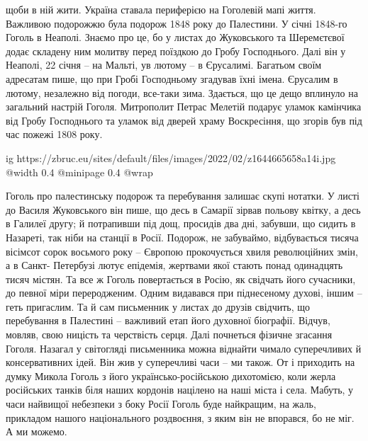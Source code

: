 щоби в ній жити. Україна ставала периферією на Гоголевій мапі життя. Важливою
подорожжю була подорож 1848 року до Палестини. У січні 1848-го Гоголь в
Неаполі. Знаємо про це, бо у листах до Жуковського та Шеремєтєвої додає
складену ним молитву перед поїздкою до Гробу Господнього. Далі він у Неаполі,
22 січня – на Мальті, ув лютому – в Єрусалимі. Багатьом своїм адресатам пише,
що при Гробі Господньому згадував їхні імена. Єрусалим в лютому, незалежно від
погоди, все-таки зима. Здається, що це дещо вплинуло на загальний настрій
Гоголя. Митрополит Петрас Мелетій подарує уламок камінчика від Гробу
Господнього та уламок від дверей храму Воскресіння, що згорів був під час
пожежі 1808 року. 

\ifcmt
  ig https://zbruc.eu/sites/default/files/images/2022/02/z1644665658a14i.jpg
  @width 0.4
  @minipage 0.4
  @wrap \parpic[r]
\fi


Гоголь про палестинську подорож та перебування залишає скупі
нотатки. У листі до Василя Жуковського він пише, що десь в Самарії зірвав
польову квітку, а десь в Галилеї другу; й потрапивши під дощ, просидів два дні,
забувши, що сидить в Назареті, так ніби на станції в Росії. Подорож, не
забуваймо, відбувається тисяча вісімсот сорок восьмого року – Європою
прокочується хвиля революційних змін, а в Санкт- Петербузі лютує епідемія,
жертвами якої стають понад одинадцять тисяч містян. Та все ж Гоголь
повертається в Росію, як свідчать його сучасники, до певної міри переродженим.
Одним видавався при піднесеному духові, іншим – геть пригаслим. Та й сам
письменник у листах до друзів свідчить, що перебування в Палестині – важливий
етап його духовної біографії. Відчув, мовляв, свою ницість та черствість серця.
Далі почнеться фізичне згасання Гоголя. Назагал у світогляді письменника можна
віднайти чимало суперечливих й консервативних ідей. Він жив у суперечливі часи
– ми також. От і приходить на думку Микола Гоголь з його українсько-російською
дихотомією, коли жерла російських танків біля наших кордонів націлено на наші
міста і села. Мабуть, у часи найвищої небезпеки з боку Росії Гоголь буде
найкращим, на жаль, прикладом нашого національного роздвоєння, з яким він не
впорався, бо не міг. А ми можемо.



